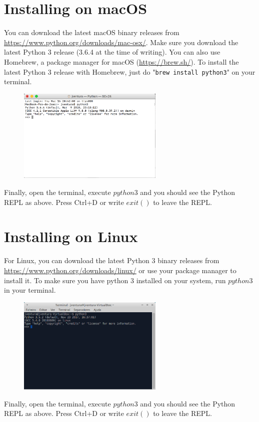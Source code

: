 \section{Installing on macOS}

You can download the latest macOS binary releases from \url{https://www.python.org/downloads/mac-osx/}. Make sure you download the latest Python 3 release (3.6.4 at the time of writing). You can also use Homebrew, a package manager for macOS (\url{https://brew.sh/}). To install the latest Python 3 release with Homebrew, just do "\texttt{brew install python3}" on your terminal.

\begin{figure}[H]
	\centering
  	\includegraphics[width=0.62\textwidth]{images/python_macos.png}
\end{figure}

Finally, open the terminal, execute $python3$ and you should see the Python REPL as above. Press Ctrl+D or write $exit()$ to leave the REPL.

\section{Installing on Linux}

For Linux, you can download the latest Python 3 binary releases from \url{https://www.python.org/downloads/linux/} or use your package manager to install it. To make sure you have python 3 installed on your system, run $python3$ in your terminal.

\begin{figure}[H]
	\centering
  	\includegraphics[width=0.62\textwidth]{images/python_linux.png}
\end{figure}

Finally, open the terminal, execute $python3$ and you should see the Python REPL as above. Press Ctrl+D or write $exit()$ to leave the REPL.